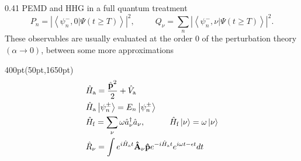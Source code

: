 \documentclass[20pt]{beamer}
\begin{document}
\begin{frame}
\begin{textblock*}{0.41\textwidth}
{\normalsize
{\small PEMD and HHG in a full quantum treatment } \\
\begin{equation}
P_n = \left| \left\langle \psi_n^-,0 
  | \Psi(t\geqslant T)\right\rangle\right|^2,
 \hspace{30pt}
Q_\nu = \sum_n \left| \left\langle \psi_n^-,\nu 
  | \Psi(t\geqslant T)\right\rangle\right|^2.
 \nonumber
\end{equation}}
{
\small \noindent These observables are usually evaluated 
at the order 0 of the perturbation theory $(\alpha \longrightarrow 0)$,
between some more approximations}
\end{textblock*}


\begin{textblock*}{400pt}(50pt,1650pt)
\scriptsize
\begin{align}
&\hat{H}_{\rm a} = \frac{\hat{\boldsymbol{\rm p}}^2}{2} + \hat{V}_{\rm a} \nonumber\\
&\hat{H}_{\rm a} \left|\psi_n^{\pm}\right\rangle = E_n \left|\psi_n^{\pm}\right\rangle\nonumber \\
& \hat{H}_{\rm f} =  \sum_{\nu} \omega \hat{a}_\nu^\dagger \hat{a}_\nu,
\hspace{30pt} \hat{H}_{\rm f}\left|\nu\right\rangle = 
\omega \left|\nu\right\rangle \nonumber\\
& \hat{R}_\nu = \int e^{i\hat{H}_{\rm a}t}\boldsymbol{\hat{\rm A}}_\nu
\boldsymbol{\hat{\rm p}} e^{-i\hat{H}_{\rm a}t}
e^{i\omega t - \epsilon t} dt
\nonumber
\end{align}
\end{textblock*}



\end{frame}
\end{document}
